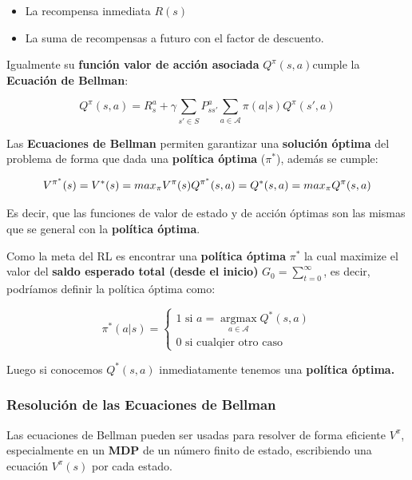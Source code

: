 \documentclass[
  a4paper,
  DIV=11,
  numbers=noendperiod]{scrreprt}
\providecommand{\tightlist}{%
  \setlength{\itemsep}{0pt}\setlength{\parskip}{0pt}}\usepackage{longtable,booktabs,array}
\begin{document}
\begin{itemize}
\tightlist
\item
  La recompensa inmediata \(R(s)\)
\item
  La suma de recompensas a futuro con el factor de descuento.
\end{itemize}

Igualmente su \textbf{función valor de acción asociada}
\(Q^\pi(s,a)\)cumple la \textbf{Ecuación de Bellman}:

\[
Q^\pi(s,a) = R_s^a+\gamma \sum_{s'\in S} P_{ss'}^{a}\sum_{a \in \mathcal A} \pi (a|s)Q^\pi(s',a)
\]

Las \textbf{Ecuaciones de Bellman} permiten garantizar una
\textbf{solución óptima} del problema de forma que dada una
\textbf{política óptima} (\(\pi^*\)), además se cumple:

\[
V^{\pi^*}(s)=V^*(s)=max_\pi V^\pi(s)\\
Q^{\pi^*}(s,a)=Q^*(s,a)=max_\pi Q^\pi(s,a)
\]

Es decir, que las funciones de valor de estado y de acción óptimas son
las mismas que se general con la \textbf{política óptima}.

Como la meta del RL es encontrar una \textbf{política óptima} \(\pi^*\)
la cual maximize el valor del \textbf{saldo esperado total (desde el
inicio)} \(G_0=\sum_{t=0}^\infty\), es decir, podríamos definir la
política óptima como:

\begin{equation}
\pi^*(a|s)= \left\lbrace
\begin{array}{ll}
1 \text{ si } a=\mathop{\mathrm{argmax}}\limits_{a \in \mathcal A} Q^* (s,a) \\
0 \text{ si cualqier otro caso} 
\end{array}
\right.
\end{equation}

Luego si conocemos \(Q^*(s,a)\) inmediatamente tenemos una
\textbf{política óptima.}

\subsubsection{Resolución de las Ecuaciones de
Bellman}\label{resoluciuxf3n-de-las-ecuaciones-de-bellman}

Las ecuaciones de Bellman pueden ser usadas para resolver de forma
eficiente \(V^\pi\), especialmente en un \textbf{MDP} de un número
finito de estado, escribiendo una ecuación \(V^\pi (s)\) por cada
estado.
\end{document}
